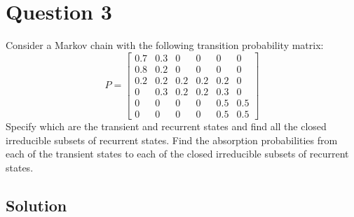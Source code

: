 \section*{Question 3}

Consider a Markov chain with the following transition probability matrix:
\[
    P=
    \begin{bmatrix}
        0.7 & 0.3 & 0   & 0   & 0   & 0   \\
        0.8 & 0.2 & 0   & 0   & 0   & 0   \\
        0.2 & 0.2 & 0.2 & 0.2 & 0.2 & 0   \\
        0   & 0.3 & 0.2 & 0.2 & 0.3 & 0   \\
        0   & 0   & 0   & 0   & 0.5 & 0.5 \\
        0   & 0   & 0   & 0   & 0.5 & 0.5
    \end{bmatrix}
\]
Specify which are the transient and recurrent states and find all the closed irreducible subsets of recurrent states.
Find the absorption probabilities from each of the transient states to each of the closed irreducible subsets of recurrent states.

\subsection*{Solution}
